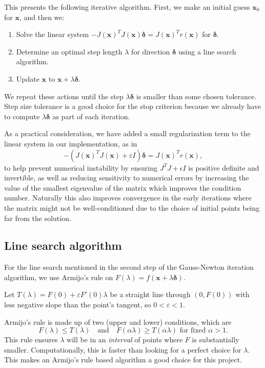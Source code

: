 \documentclass[12pt, a4paper]{article}
\newcommand{\bx}{{\boldsymbol{x}}}
\newcommand{\bd}{{\boldsymbol{\delta}}}
\begin{document}
This presents the following iterative algorithm. First, we make an initial guess $\bx_0$ for $\bx$, and then we:
\begin{enumerate}
    \item Solve the linear system $-{J(\bx)}^T J(\bx)\bd={J(\bx)}^T r(\bx)$ for $\bd$.
    \item Determine an optimal step length $\lambda$ for direction $\bd$ using a line search algorithm.
    \item Update $\bx$ to $\bx+\lambda\bd$.
\end{enumerate}
We repeat these actions until the step $\lambda\bd$ is smaller than some chosen tolerance. Step size tolerance is a good choice for the stop criterion because we already have to compute $\lambda\bd$ as part of each iteration.

As a practical consideration, we have added a small regularization term to the linear system in our implementation, as in \[-({J(\bx)}^T J(\bx)+\varepsilon I)\bd={J(\bx)}^T r(\bx),\] to help prevent numerical instability by ensuring $J^T J+ϵI$ is positive definite and invertible, as well as reducing sensitivity to numerical errors by increasing the value of the smallest eigenvalue of the matrix which improves the condition number. Naturally this also improves convergence in the early iterations where the matrix might not be well-conditioned due to the choice of initial points being far from the solution.

\subsection{Line search algorithm}

For the line search mentioned in the second step of the Gauss-Newton iteration algorithm, we use Armijo's rule on $F(\lambda)=f(\bx+\lambda\bd)$.

Let $T(\lambda)=F(0)+\varepsilon F'(0)\lambda$ be a straight line through $(0,F(0))$ with less negative slope than the point's tangent, so $0<\varepsilon<1$.

Armijo's rule is made up of two (upper and lower) conditions, which are\[F(\lambda)\le T(\lambda)\quad\text{and}\quad F(\alpha\lambda)\ge T(\alpha\lambda)\text{ for fixed }\alpha>1.\]
This rule ensures $\lambda$ will be in an \textit{interval} of points where $F $ is substantially smaller. Computationally, this is faster than looking for a perfect choice for $\lambda$. This makes an Armijo's rule based algorithm a good choice for this project.
\end{document}
